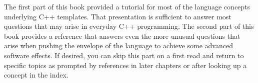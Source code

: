 The first part of this book provided a tutorial for most of the language concepts underlying C++ templates. That presentation is sufficient to answer most questions that may arise in everyday C++ programming. The second part of this book provides a reference that answers even the more unusual questions that arise when pushing the envelope of the language to achieve some advanced software effects. If desired, you can skip this part on a first read and return to specific topics as prompted by references in later chapters or after looking up a concept in the index.